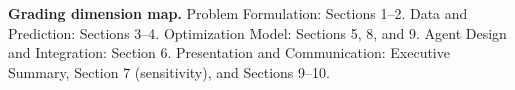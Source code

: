 \documentclass[11pt]{article}
\begin{document}
\vspace{0.5em}
\noindent\textbf{Grading dimension map.} Problem Formulation: Sections 1--2. Data and Prediction: Sections 3--4. Optimization Model: Sections 5, 8, and 9. Agent Design and Integration: Section 6. Presentation and Communication: Executive Summary, Section 7 (sensitivity), and Sections 9--10.
\end{document}
